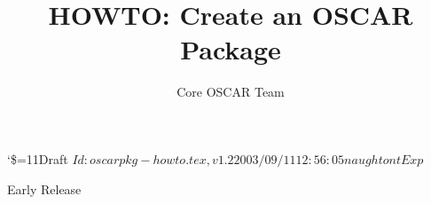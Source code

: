 \documentclass[letterpaper]{article}
\title{HOWTO: Create an OSCAR Package}
\author{Core OSCAR Team}
\begin{document}
\maketitle

\begin{center}
  {\catcode`\$=11\tiny\noindent Draft $Id: oscarpkg-howto.tex,v 1.2 2003/09/11 12:56:05 naughtont Exp $}

  \begin{large}Early Release\end{large}
\end{center}






\end{document}
